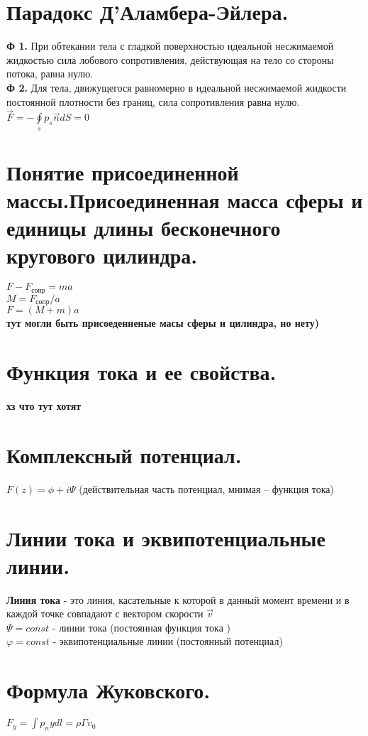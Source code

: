 \begin{multicols*}{4}
		\section{Парадокс Д’Аламбера-Эйлера.}
		\textbf{Ф 1.} При обтекании тела с гладкой поверхностью идеальной
		несжимаемой жидкостью сила лобового сопротивления, действующая на тело
		со стороны потока, равна нулю. \\
		\textbf{Ф 2.} Для тела, движущегося равномерно в идеальной несжимаемой жидкости постоянной плотности без границ, сила сопротивления равна
		нулю.\\
		$\vec{F}=-\oint\limits_sp_s\vec{n}dS=0$
		
		\section{Понятие присоединенной массы.Присоединенная масса сферы и единицы длины бесконечного кругового цилиндра.}
		$F-F_\text{сопр}=ma$ \\
		$M=F_\text{сопр}/a$ \\
		$F=(M+m)a$ \\ 
		\textbf{тут могли быть присоеденненые масы сферы и цилиндра, но нету)}
		
		\section{Функция тока и ее свойства.}
		\textbf{хз что тут хотят}
		
		\section{Комплексный потенциал.}
		$F(z)=\phi+i\Psi$ (действительная часть
		потенциал, мнимая – функция тока)
		
		\section{Линии тока и эквипотенциальные линии.}
		\textbf{Линия тока} - это линия, касательные к которой в данный момент времени и
		в каждой точке совпадают с вектором скорости  $\vec{v}$ \\
		
		$\Psi = const$ - линии тока (постоянная функция тока ) \\
		$\varphi = const$ - эквипотенциальные линии (постоянный потенциал)
		
		\section{Формула Жуковского.}
		$F_y=\int p_nydl=\rho\Gamma v_0$
		

\end{multicols*}
